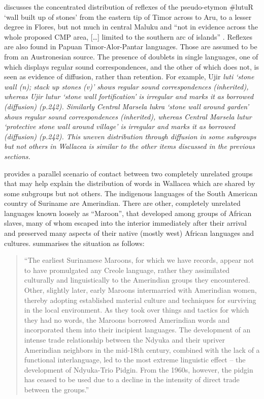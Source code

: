 \citet{Schapper2020a} discusses the concentrated distribution
of reflexes of the pseudo-etymon {\#}lutuR ‘wall built up of
stones’ from the eastern tip of Timor across to Aru,
to a lesser degree in Flores,
but not much in central Maluku
and “not in evidence across the whole proposed CMP area,
[{\ldots}] limited to the southern arc of islands” \citep[241]{Schapper2020a}.
Reflexes are also found in Papuan Timor-Alor-Pantar languages.
Those are assumed to be from an Austronesian source.
The presence of doublets in single languages,
one of which displays regular sound correspondences,
and the other of which does not,
is seen as evidence of diffusion, rather than retention.
For example, Ujir \it{luti} ‘stone wall (n); stack up stones
(v)’ shows regular sound correspondences (inherited),
whereas Ujir \it{lutur} ‘stone wall fortification’ is irregular
and marks it as borrowed (diffusion) (p.242).
Similarly Central Marsela \it{lukra} ‘stone wall around garden’
shows regular sound correspondences (inherited),
whereas Central Marsela \it{lutur} ‘protective stone wall around
village’ is irregular and marks it as borrowed (diffusion) (p.242).
This uneven distribution through diffusion in some subgroups
but not others in Wallacea is similar to the other items discussed
in the previous sections.

\citet{Borges2014} provides a parallel scenario of contact between
two completely unrelated groups that may help explain the distribution
of words in Wallacea which are shared by some subgroups but not others.
The indigenous languages of the South American country of Suriname are Amerindian.
There are other, completely unrelated languages known loosely
as ``Maroon'', that developed among groups of African slaves,
many of whom escaped into the interior immediately after their
arrival and preserved many aspects of their native (mostly west) African languages and cultures.
\citet[99]{Borges2014} summarises the situation as follows:

\begin{quote}
	“The earliest Surinamese Maroons,
	for which we have records,
	appear not to have promulgated any Creole language,
	rather they assimilated culturally
	and linguistically to the Amerindian groups they encountered.
	Other, slightly later, early Maroons intermarried with Amerindian
	women, thereby adopting established material culture
	and techniques for surviving in the local environment.
	As they took over things
	and tactics for which they had no words,
	the Maroons borrowed Amerindian words
	and incorporated them into their incipient languages.
	The development of an intense trade relationship between the
	Ndyuka and their upriver Amerindian neighbors in the mid-18th century,
	combined with the lack of a functional interlanguage,
	led to the most extreme linguistic effect -- the development of Ndyuka-Trio Pidgin.
	From the 1960s, however,
	the pidgin has ceased to be used due to a decline in the intensity
	of direct trade between the groups.” \citep[99]{Borges2014}
\end{quote}

